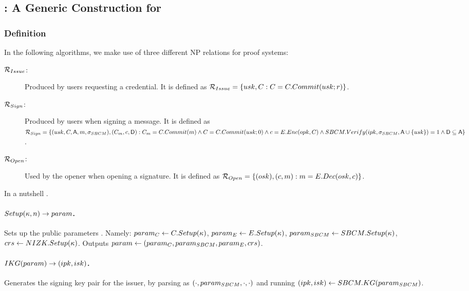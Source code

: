 \subsection{\GSACGen: A Generic Construction for \GSAC}
\label{ssec:generic-gsac}


\subsubsection{Definition}
\label{sssec:generic-gsac-definition}

In the following algorithms, we make use of three different NP relations for
\NIZK proof systems:

\begin{description}
\item[$\mathcal{R}_{Issue}$:] Produced by users requesting a credential. It is
  defined as $\mathcal{R}_{Issue} = \lbrace usk, C :
  C = C.Commit(usk; r) \rbrace$.
\item[$\mathcal{R}_{Sign}$:] Produced by users when signing a message. It is
  defined as $\mathcal{R}_{Sign} = \lbrace (usk,C,\mathsf{A},m,\sigma_{SBCM}),
  (C_{m},c,\mathsf{D}) : C_{m} = C.Commit(m) \land C =
  C.Commit(usk; 0) \land c = E.Enc(opk,C)
  \land SBCM.Verify(ipk,\sigma_{SBCM},\mathsf{A} \cup \lbrace usk \rbrace) = 1
  \land \mathsf{D} \subseteq \mathsf{A} \rbrace$.
\item[$\mathcal{R}_{Open}$:] Used by the opener when opening a signature. It
  is defined as $\mathcal{R}_{Open} = \lbrace (osk), (c,m) :
  m = E.Dec(osk,c) \rbrace$.
\end{description}

In a nutshell .

\paragraph{$Setup(\kappa,n) \rightarrow param$.} %
Sets up the public parameters . Namely: $param_C \gets C.Setup(\kappa)$, $param_{E} \gets
E.Setup(\kappa)$, $param_{SBCM} \gets SBCM.Setup(\kappa)$, $crs \gets
NIZK.Setup(\kappa)$. Outputs $param \gets (param_C,param_{SBCM},param_{E},crs)$.

\paragraph{$IKG(param) \rightarrow (ipk,isk)$.} %
Generates the signing key pair for the issuer, by parsing \parm as
$(\cdot,param_{SBCM},\cdot,\cdot)$ and running $(ipk,isk) \gets
SBCM.KG(param_{SBCM})$.

